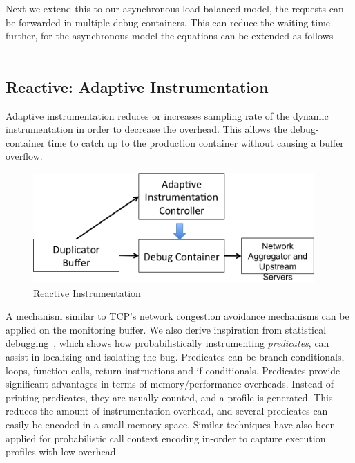 Next we extend this to our asynchronous load-balanced model, the requests can be forwarded in multiple debug containers.
This can reduce the waiting time further, for the asynchronous model the equations can be extended as follows\\ \\
\fi


\subsection{Reactive: Adaptive Instrumentation}
\label{sec:activeAdaptiveInstrumentation}

Adaptive instrumentation reduces or increases sampling rate of the dynamic instrumentation in order to decrease the overhead. 
This allows the debug-container time to catch up to the production container without causing a buffer overflow.

\begin{figure}[ht!]
	\begin{center}
		\includegraphics[width=0.96\textwidth]{queue/figs/reactive-controller.png}
		\caption{Reactive Instrumentation}
		\label{fig:reactive}
	\end{center}
\end{figure}

A mechanism similar to TCP's network congestion avoidance mechanisms can be applied on the monitoring buffer.
We also derive inspiration from statistical debugging~\cite{statisticalPerformance,holmes,statisticalDebugging}, which shows how probabilistically instrumenting \emph{predicates}, can assist in localizing and isolating the bug. 
Predicates can be branch conditionals, loops, function calls, return instructions and if conditionals.
Predicates provide significant advantages in terms of memory/performance overheads.
Instead of printing predicates, they are usually counted, and a profile is generated.
This reduces the amount of instrumentation overhead, and several predicates can easily be encoded in a small memory space.
Similar techniques have also been applied for probabilistic call context encoding in-order to capture execution profiles with low overhead.


